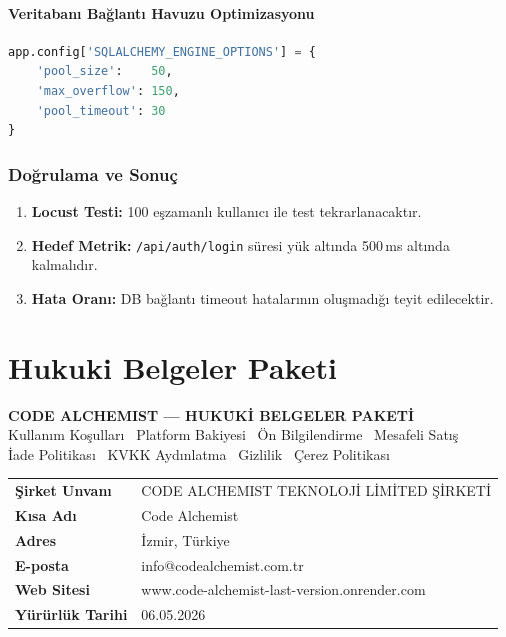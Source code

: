 \documentclass[12pt,a4paper]{article}
\begin{document}
\subsection{Veritaban{\i} Ba\u{g}lant{\i} Havuzu Optimizasyonu}
\begin{lstlisting}[language=Python, caption={DB Connection Pool G\"{u}ncellemesi}]
app.config['SQLALCHEMY_ENGINE_OPTIONS'] = {
    'pool_size':    50,
    'max_overflow': 150,
    'pool_timeout': 30
}
\end{lstlisting}

\section{Do\u{g}rulama ve Sonu\c{c}}
\begin{enumerate}
  \item \textbf{Locust Testi:} 100 e\c{s}zamanl{\i} kullan{\i}c{\i} ile test tekrarlanacakt{\i}r.
  \item \textbf{Hedef Metrik:} \texttt{/api/auth/login} s\"{u}resi y\"{u}k alt{\i}nda 500\,ms alt{\i}nda kalmal{\i}d{\i}r.
  \item \textbf{Hata Oran{\i}:} DB ba\u{g}lant{\i} timeout hatalar{\i}n{\i}n olu\c{s}mad{\i}\u{g}{\i} teyit edilecektir.
\end{enumerate}

\part{Hukuki Belgeler Paketi}

\begin{center}
\large\textbf{CODE ALCHEMIST --- HUK\.{U}K\.{I} BELGELER PAKET\.{I}} \\[0.5em]
\normalsize
Kullan{\i}m Ko\c{s}ullar{\i} \textbullet\ Platform Bakiyesi \textbullet\ \"{O}n Bilgilendirme
\textbullet\ Mesafeli Sat{\i}\c{s} \\
\.{I}ade Politikas{\i} \textbullet\ KVKK Ayd{\i}nlatma \textbullet\ Gizlilik
\textbullet\ \c{C}erez Politikas{\i}
\end{center}

\begin{center}
\begin{tabular}{|l|l|}
\hline
\textbf{\c{S}irket Unvan{\i}} & CODE ALCHEMIST TEKNOLOJ\.{I} L\.{I}M\.{I}TED \c{S}\.{I}RKET\.{I} \\
\textbf{K{\i}sa Ad{\i}}       & Code Alchemist \\
\textbf{Adres}                 & \.{I}zmir, T\"{u}rkiye \\
\textbf{E-posta}               & info@codealchemist.com.tr \\
\textbf{Web Sitesi}            & www.code-alchemist-last-version.onrender.com \\
\textbf{Y\"{u}r\"{u}rl\"{u}k Tarihi} & 06.05.2026 \\
\hline
\end{tabular}
\end{center}
\end{document}
